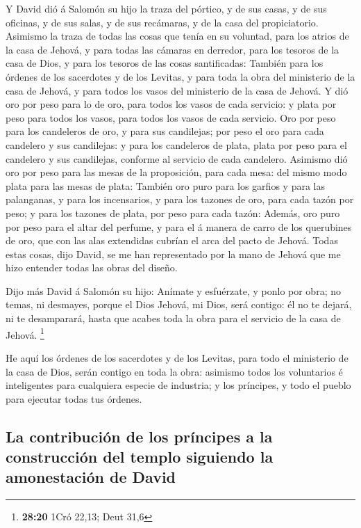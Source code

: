  Y David dió á Salomón su hijo la traza del pórtico, y de
sus casas, y de sus oficinas, y de sus salas, y de sus recámaras, y de
la casa del propiciatorio.  Asimismo la traza de todas las
cosas que tenía en su voluntad, para los atrios de la casa de Jehová, y
para todas las cámaras en derredor, para los tesoros de la casa de Dios,
y para los tesoros de las cosas santificadas:  También para
los órdenes de los sacerdotes y de los Levitas, y para toda la obra del
ministerio de la casa de Jehová, y para todos los vasos del ministerio
de la casa de Jehová.  Y dió oro por peso para lo de oro,
para todos los vasos de cada servicio: y plata por peso para todos los
vasos, para todos los vasos de cada servicio.  Oro por peso
para los candeleros de oro, y para sus candilejas; por peso el oro para
cada candelero y sus candilejas: y para los candeleros de plata, plata
por peso para el candelero y sus candilejas, conforme al servicio de
cada candelero.  Asimismo dió oro por peso para las mesas
de la proposición, para cada mesa: del mismo modo plata para las mesas
de plata:  También oro puro para los garfios y para las
palanganas, y para los incensarios, y para los tazones de oro, para cada
tazón por peso; y para los tazones de plata, por peso para cada tazón:
 Además, oro puro por peso para el altar del perfume, y
para el á manera de carro de los querubines de oro, que con las alas
extendidas cubrían el arca del pacto de Jehová.  Todas
estas cosas, dijo David, se me han representado por la mano de Jehová
que me hizo entender todas las obras del diseño.

 Dijo más David á Salomón su hijo: Anímate y esfuérzate, y
ponlo por obra; no temas, ni desmayes, porque el Dios Jehová, mi Dios,
será contigo: él no te dejará, ni te desamparará, hasta que acabes toda
la obra para el servicio de la casa de Jehová. \footnote{\textbf{28:20}
  1Cró 22,13; Deut 31,6}

 He aquí los órdenes de los sacerdotes y de los Levitas,
para todo el ministerio de la casa de Dios, serán contigo en toda la
obra: asimismo todos los voluntarios é inteligentes para cualquiera
especie de industria; y los príncipes, y todo el pueblo para ejecutar
todas tus órdenes.

\hypertarget{la-contribuciuxf3n-de-los-pruxedncipes-a-la-construcciuxf3n-del-templo-siguiendo-la-amonestaciuxf3n-de-david}{%
\subsection{La contribución de los príncipes a la construcción del
templo siguiendo la amonestación de
David}\label{la-contribuciuxf3n-de-los-pruxedncipes-a-la-construcciuxf3n-del-templo-siguiendo-la-amonestaciuxf3n-de-david}}

